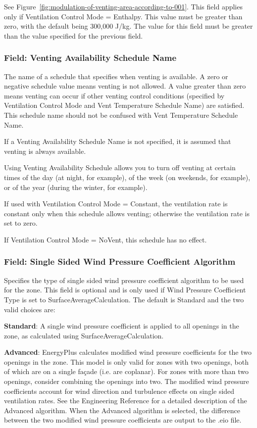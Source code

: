 See Figure~\ref{fig:modulation-of-venting-area-according-to-001}. This field applies only if Ventilation Control Mode = Enthalpy. This value must be greater than zero, with the default being 300,000 J/kg. The value for this field must be greater than the value specified for the previous field.

\subsubsection{Field: Venting Availability Schedule Name}\label{field-venting-availability-schedule-name}

The name of a schedule that specifies when venting is available. A zero or negative schedule value means venting is not allowed. A value greater than zero means venting can occur if other venting control conditions (specified by Ventilation Control Mode and Vent Temperature Schedule Name) are satisfied. This schedule name should not be confused with Vent Temperature Schedule Name.

If a Venting Availability Schedule Name is not specified, it is assumed that venting is always available.

Using Venting Availability Schedule allows you to turn off venting at certain times of the day (at night, for example), of the week (on weekends, for example), or of the year (during the winter, for example).

If used with Ventilation Control Mode = Constant, the ventilation rate is constant only when this schedule allows venting; otherwise the ventilation rate is set to zero.

If Ventilation Control Mode = NoVent, this schedule has no effect.

\subsubsection{Field: Single Sided Wind Pressure Coefficient Algorithm}

Specifies the type of single sided wind pressure coefficient algorithm to be used for
the zone. This field is optional and is only used if Wind Pressure Coefficient Type is
set to SurfaceAverageCalculation. The default is Standard and the two valid choices are:

\textbf{Standard}: A single wind pressure coefficient is applied to all openings in the
zone, as calculated using SurfaceAverageCalculation.

\textbf{Advanced}: EnergyPlus calculates modified wind pressure coefficients for the two
openings in the zone. This model is only valid for zones with two openings, both of which
are on a single fa\c{c}ade (i.e. are coplanar). For zones with more than two openings,
consider combining the openings into two. The modified wind pressure coefficients account
for wind direction and turbulence effects on single sided ventilation rates. See the
Engineering Reference for a detailed description of the Advanced algorithm. When the
Advanced algorithm is selected, the difference between the two modified wind pressure
coefficients are output to the .eio file.

